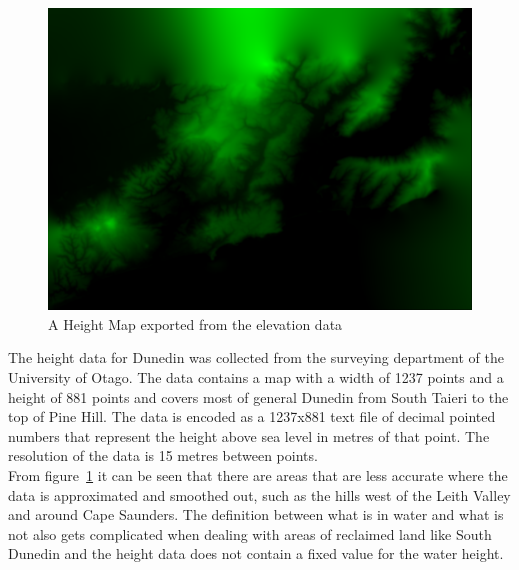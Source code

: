 \documentclass[12pt]{report}
\begin{document}
\begin{figure}[h]
\includegraphics[scale=0.25]{height.png}
\caption{A Height Map exported from the elevation data}
\label{image:elevation}
\end{figure}

The height data for Dunedin was collected from the surveying department of the University of Otago. The data contains a map with a width of 1237 points and a height of 881 points and covers most of general Dunedin from South Taieri to the top of Pine Hill. The data is encoded as a 1237x881 text file of decimal pointed numbers that represent the height above sea level in metres of that point. The resolution of the data is 15 metres between points.\\

From figure~\ref{image:elevation} it can be seen that there are areas that are less accurate where the data is approximated and smoothed out, such as the hills west of the Leith Valley and around Cape Saunders. The definition between what is in water and what is not also gets complicated when dealing with areas of reclaimed land like South Dunedin and the height data does not contain a fixed value for the water height.\\
\end{document}
